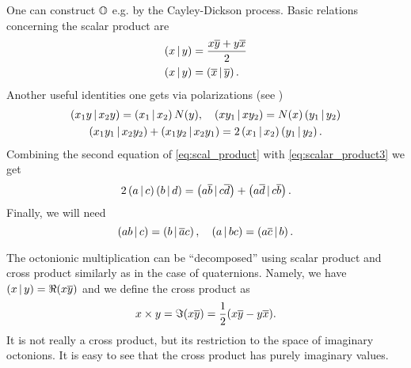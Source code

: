 One can construct $\mathbb{O}$ e.g. by the Cayley-Dickson process. Basic relations concerning the scalar product are 
\begin{equation}\label{eq:scal_product}
\begin{aligned}
\left( x \,|\, y \right) & = \frac{ x\overline{y} + y\overline{x}}{2}\\
\left( x \,|\, y \right) & = \left( \overline{x} \,|\, \overline{y} \right).
\end{aligned}
\end{equation}
Another useful  identities one gets via polarizations (see \cite[p. 5]{springer_octonions_2000})
\begin{gather}
\left( x_1y \,|\, x_2y \right) = \left( x_1 \,|\, x_2 \right) N(y), \quad \left( xy_1 \,|\, xy_2 \right) = N(x)\left( y_1 \,|\, y_2 \right) \label{eq:scalar_product2}\\
\left( x_1y_1 \,|\, x_2y_2 \right) + \left( x_1y_2 \,|\, x_2y_1 \right) = 2\left( x_1 \,|\, x_2 \right)\left( y_1 \,|\, y_2 \right).\label{eq:scalar_product3}
\end{gather}
Combining the second equation of \eqref{eq:scal_product} with \eqref{eq:scalar_product3} we get
\begin{equation}\label{eq:scalar_product4}
2\left( a \,|\, c \right)\left( b \,|\, d \right) = \left( a\overline{b} \,|\, c\overline{d} \right) + \left( a\overline{d} \,|\, c\overline{b} \right).
\end{equation}
Finally, we will need
\begin{equation}\label{eq:scalar_product5}
\left( ab \,|\, c \right) = \left( b \,|\, \overline{a}c \right), \quad \left( a \,|\, bc \right) = \left( a\overline{c} \,|\, b \right).
\end{equation}

The octonionic multiplication  can be ``decomposed'' using scalar product and cross product similarly  as in the case of quaternions. Namely, we have $\left( x \,|\, y \right) = \Re( x\overline{y})$ and we define the cross product as \[x \times y = \Im (x\overline{y}) = \frac{1}{2}( x\overline{y} - y\overline{x}).\] It is not really a cross product, but its restriction to the space of imaginary octonions. It is easy to see that the cross product has purely imaginary values.


